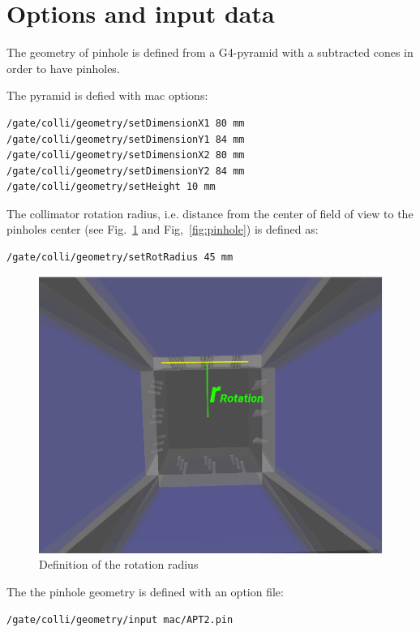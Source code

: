 \documentclass[12pt]{article}
\begin{document}
\section{Options and input data}
The geometry of pinhole is defined from a G4-pyramid with a subtracted cones in order to have pinholes.

The pyramid is defied with mac options:  
\begin{verbatim}
/gate/colli/geometry/setDimensionX1 80 mm
/gate/colli/geometry/setDimensionY1 84 mm
/gate/colli/geometry/setDimensionX2 80 mm
/gate/colli/geometry/setDimensionY2 84 mm
/gate/colli/geometry/setHeight 10 mm
\end{verbatim}

The collimator rotation radius, i.e. distance from the center of field of view to the pinholes center (see Fig.~\ref{fig:rot_radius} and Fig,~\ref{fig:pinhole}) is defined as:
\begin{verbatim}
/gate/colli/geometry/setRotRadius 45 mm
\end{verbatim}

\begin{figure}[htp]
\centering
\includegraphics[scale=0.3]{figs/rot_radius.png}
\caption{Definition of the rotation radius}
\label{fig:rot_radius}
\end{figure}


The the pinhole geometry is defined with an option file:
\begin{verbatim}
/gate/colli/geometry/input mac/APT2.pin
\end{verbatim}
\end{document}

